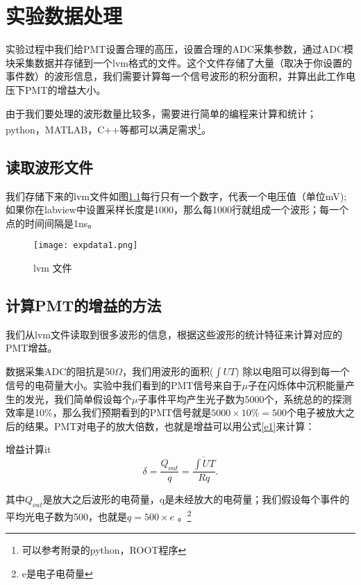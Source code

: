 \documentclass{elegantbook}
\author{ 物理楼\&220 }
\date{\today}
\begin{document}
\maketitle
\tableofcontents
\chapter{实验数据处理 }
实验过程中我们给PMT设置合理的高压，设置合理的ADC采集参数，通过ADC模块采集数据并存储到一个lvm格式的文件。这个文件存储了大量（取决于你设置的事件数）的波形信息，我们需要计算每一个信号波形的积分面积，并算出此工作电压下PMT的增益大小。

由于我们要处理的波形数量比较多，需要进行简单的编程来计算和统计；python，MATLAB，C++等都可以满足需求\footnote{可以参考附录的python，ROOT程序}。
\section{读取波形文件}
我们存储下来的lvm文件如图\ref{fig:g}每行只有一个数字，代表一个电压值（单位mV);如果你在labview中设置采样长度是1000，那么每1000行就组成一个波形；每一个点的时间间隔是1ns。
\begin{figure}[!htbp]
	\centering
	\texttt{[image: expdata1.png]}
	\caption{lvm 文件\label{fig:g}}
\end{figure}


\section{计算PMT的增益的方法}
我们从lvm文件读取到很多波形的信息，根据这些波形的统计特征来计算对应的PMT增益。

数据采集ADC的阻抗是50$\Omega$，我们用波形的面积($\int UT$) 除以电阻可以得到每一个信号的电荷量大小。实验中我们看到的PMT信号来自于$\mu$子在闪烁体中沉积能量产生的发光，我们简单假设每个$\mu$子事件平均产生光子数为5000个，系统总的的探测效率是10\%，那么我们预期看到的PMT信号就是$5000\times 10\%=500$个电子被放大之后的结果。PMT对电子的放大倍数，也就是增益可以用公式\ref{e1}来计算：
\begin{definition}{增益计算}{it}
\begin{equation}
   \label{e1}
	\delta=\frac{Q_{out}}{q}=\frac{\overline{\int UT}}{Rq}.
\end{equation}
\end{definition}
其中$Q_{out}$是放大之后波形的电荷量，q是未经放大的电荷量；我们假设每个事件的平均光电子数为500，也就是$q=500\times e$ 。\footnote{e是电子电荷量}
\end{document}
